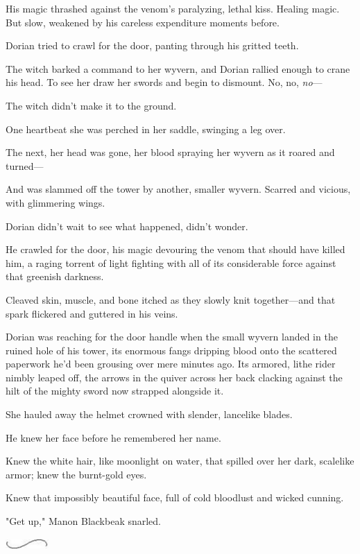 His magic thrashed against the venom's paralyzing, lethal kiss.
Healing magic.
But slow, weakened by his careless expenditure moments before.

Dorian tried to crawl for the door, panting through his gritted teeth.

The witch barked a command to her wyvern, and Dorian rallied enough to crane his head.
To see her draw her swords and begin to dismount.
No, no, \emph{no}---

The witch didn't make it to the ground.

One heartbeat she was perched in her saddle, swinging a leg over.

The next, her head was gone, her blood spraying her wyvern as it roared and turned---

And was slammed off the tower by another, smaller wyvern.
Scarred and vicious, with glimmering wings.

Dorian didn't wait to see what happened, didn't wonder.

He crawled for the door, his magic devouring the venom that should have killed him, a raging torrent of light fighting with all of its considerable force against that greenish darkness.

Cleaved skin, muscle, and bone itched as they slowly knit together---and that spark flickered and guttered in his veins.

Dorian was reaching for the door handle when the small wyvern landed in the ruined hole of his tower, its enormous fangs dripping blood onto the scattered paperwork he'd been grousing over mere minutes ago.
Its armored, lithe rider nimbly leaped off, the arrows in the quiver across her back clacking against the hilt of the mighty sword now strapped alongside it.

She hauled away the helmet crowned with slender, lancelike blades.

He knew her face before he remembered her name.

Knew the white hair, like moonlight on water, that spilled over her dark, scalelike armor; knew the burnt-gold eyes.

Knew that impossibly beautiful face, full of cold bloodlust and wicked cunning.

"Get up," Manon Blackbeak snarled.

\begin{center}
	\includegraphics[width=0.65in,height=0.13in]{images/seperator}
\end{center}

